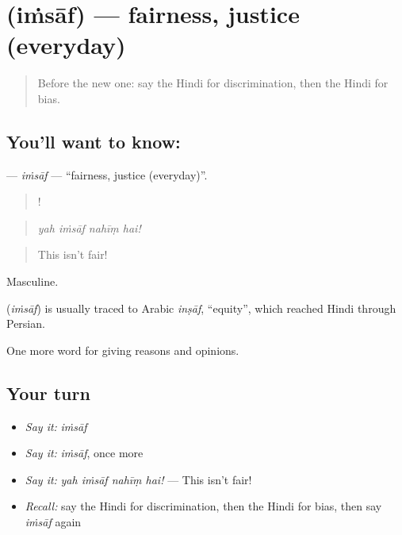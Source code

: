 \section[\texorpdfstring{\hi{इंसाफ़} (iṁsāf)}{इंसाफ़ (iṁsāf)}]{ (iṁsāf) — fairness, justice (everyday)}

\label{lesson:HI-C356-imsaf}



\begin{quote}
Before the new one: say the Hindi for discrimination, then the Hindi for bias.
\end{quote}

\subsection*{You'll want to know: }
\textbf{} — \emph{iṁsāf} — \textquotedblleft{}fairness, justice (everyday)\textquotedblright{}.

\begin{quote}
   !
\end{quote}

\begin{quote}
\emph{yah iṁsāf nahīṃ hai!}
\end{quote}

\begin{quote}
This isn't fair!
\end{quote}

Masculine.

\begin{cousinweb}
\textbf{} (\emph{iṁsāf}) is usually traced to Arabic \emph{inṣāf}, \textquotedblleft{}equity\textquotedblright{}, which reached Hindi through Persian.
\end{cousinweb}

\begin{grammarlens}[title={What you've built}]
One more word for giving reasons and opinions.
\end{grammarlens}

\subsection*{Your turn}
\begin{itemize}
\raggedright
  \item \emph{Say it:} \emph{iṁsāf}
  \item \emph{Say it:} \emph{iṁsāf}, once more
  \item \emph{Say it:} \emph{yah iṁsāf nahīṃ hai!} — This isn't fair!
  \item \emph{Recall:} say the Hindi for discrimination, then the Hindi for bias, then say \emph{iṁsāf} again
\end{itemize}

